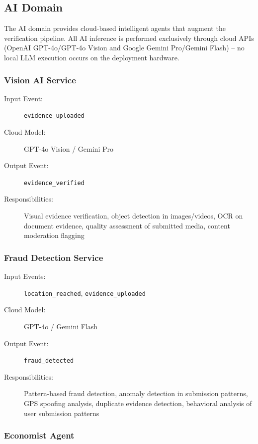 \subsection{AI Domain}

The AI domain provides cloud-based intelligent agents that augment the verification pipeline. All AI inference is performed exclusively through cloud APIs (OpenAI GPT-4o/GPT-4o Vision and Google Gemini Pro/Gemini Flash) -- no local LLM execution occurs on the deployment hardware.

\subsubsection{Vision AI Service}

\begin{description}
  \item[Input Event:] \texttt{evidence\_uploaded}
  \item[Cloud Model:] GPT-4o Vision / Gemini Pro
  \item[Output Event:] \texttt{evidence\_verified}
  \item[Responsibilities:] Visual evidence verification, object detection in images/videos, OCR on document evidence, quality assessment of submitted media, content moderation flagging
\end{description}

\subsubsection{Fraud Detection Service}

\begin{description}
  \item[Input Events:] \texttt{location\_reached}, \texttt{evidence\_uploaded}
  \item[Cloud Model:] GPT-4o / Gemini Flash
  \item[Output Event:] \texttt{fraud\_detected}
  \item[Responsibilities:] Pattern-based fraud detection, anomaly detection in submission patterns, GPS spoofing analysis, duplicate evidence detection, behavioral analysis of user submission patterns
\end{description}

\subsubsection{Economist Agent}

